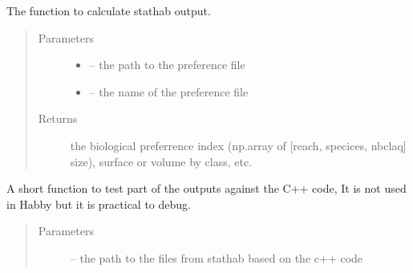 \documentclass[letterpaper,10pt,english]{sphinxmanual}
\begin{document}
\begin{fulllineitems}
\begin{fulllineitems}
\label{\detokenize{index:src.stathab_c.Stathab.stathab_calc}}
The function to calculate stathab output.
\begin{quote}\begin{description}
\item[{Parameters}] \leavevmode\begin{itemize}
\item {} 
 -- the path to the preference file

\item {} 
 -- the name of the preference file

\end{itemize}

\item[{Returns}] \leavevmode
the biological preferrence index (np.array of {[}reach, specices, nbclaq{]} size), surface or volume by class, etc.

\end{description}\end{quote}

\end{fulllineitems}


\begin{fulllineitems}
\label{\detokenize{index:src.stathab_c.Stathab.test_stathab}}
A short function to test part of the outputs against the C++ code,
It is not used in Habby but it is practical to debug.
\begin{quote}\begin{description}
\item[{Parameters}] \leavevmode
{} -- the path to the files from stathab based on the c++ code

\end{description}\end{quote}

\end{fulllineitems}


\end{fulllineitems}

\end{document}
